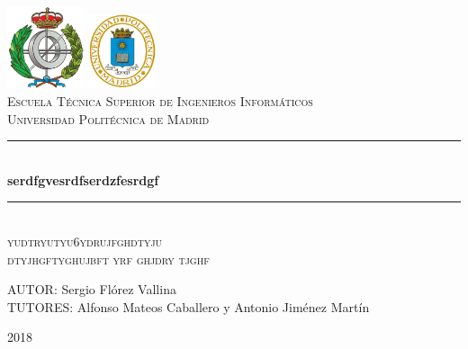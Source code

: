 \documentclass[spanish,12pt, a4paper,twoside]{paper}
\begin{document}
	\begin{titlepage}
		
		\newcommand{\HRule}{\rule{\linewidth}{0.5mm}} %
		
		\center %
		
		\includegraphics[width=2.25cm]{recursos/logoFi.png}
		\hspace{8cm}
		\includegraphics[width=2cm]{recursos/logoupm.png}
		\\[1cm]
		
		\textsc{\Large Escuela Técnica Superior de Ingenieros Informáticos}\\[0.5cm]
		\textsc{\large Universidad Politécnica de Madrid}
		\\[3cm]
		
		
		\HRule \\[0.4cm]
		{ \huge \bfseries serdfgvesrdfserdzfesrdgf}\\[0.4cm] %
		\HRule \\[2.5cm]
		
		\textsc{\LARGE yudtryutyu6ydrujfghdtyju}\\[0.5cm] 
		\textsc{\Large dtyjhgftyghujbft yrf ghjdry tjghf }\\[2.5cm]
		
		\begin{flushright}
			\large
			AUTOR: Sergio Flórez Vallina\\
			TUTORES: Alfonso Mateos Caballero y \linebreak
			Antonio Jiménez Martín
		\end{flushright}
		
		\vspace{1.3cm}
		
		{ {2018}}\\[3cm]
		
		\vfill %
		
	\end{titlepage}
	
\end{document}
